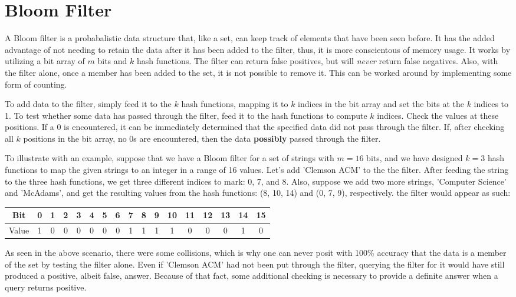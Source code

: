 \section{Bloom Filter}

A Bloom filter is a probabalistic data structure that, like a set, can keep track of elements that have been seen before.
It has the added advantage of not needing to retain the data after it has been added to the filter, thus, it is more conscientous of memory usage.
It works by utilizing a bit array of $m$ bits and $k$ hash functions.
The filter can return false positives, but will \textit{never} return false negatives.
Also, with the filter alone, once a member has been added to the set, it is not possible to remove it.
This can be worked around by implementing some form of counting.

To add data to the filter, simply feed it to the $k$ hash functions, mapping it to $k$ indices in the bit array and set the bits at the $k$ indices to 1.
To test whether some data has passed through the filter, feed it to the hash functions to compute $k$ indices.
Check the values at these positions.
If a 0 is encountered, it can be immediately determined that the specified data did not pass through the filter.
If, after checking all $k$ positions in the bit array, no 0s are encountered, then the data \textbf{possibly} passed through the filter.

To illustrate  with an example, suppose that we have a Bloom filter for a set of strings with $m = 16$ bits, and we have designed $k = 3$ hash functions to map the given strings to an integer in a range of 16 values.
Let's add 'Clemson ACM' to the the filter. After feeding the string to the three hash functions, we get three different indices to mark: 0, 7, and 8. Also, suppose we add two more strings, 'Computer Science' and 'McAdams', and get the resulting values from the hash functions: (8, 10, 14) and (0, 7, 9), respectively. the filter would appear as such:

\begin{table}[h]
	\begin{center}
		\begin{tabular}{ | c | c | c | c | c | c | c | c | c | c | c | c | c | c | c | c | c | }
			\hline
			Bit		& 0 & 1 & 2 & 3 & 4 & 5 & 6 & 7 & 8 & 9 & 10 & 11 & 12 & 13 & 14 & 15 \\ \hline
			Value	& 1 & 0 & 0 & 0 & 0 & 0 & 0 & 1 & 1 & 1 & 1  & 0  & 0  & 0  & 1  & 0  \\ \hline
		\end{tabular}
	\end{center}
\end{table}

As seen in the above scenario, there were some collisions, which is why one can never posit with 100\% accuracy that the data is a member of the set by testing the filter alone.
Even if 'Clemson ACM' had not been put through the filter, querying the filter for it would have still produced a positive, albeit false, answer.
Because of that fact, some additional checking is necessary to provide a definite answer when a query returns positive.

